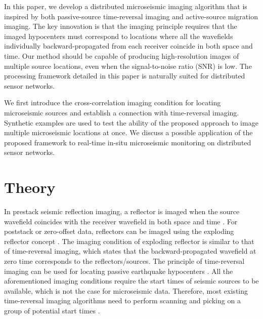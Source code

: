 In this paper, we develop a distributed microseismic imaging algorithm that is inspired by both passive-source time-reversal imaging and active-source migration imaging. The key innovation is that the imaging principle requires that the imaged hypocenters must correspond to locations where all the wavefields individually backward-propagated from each receiver coincide in both space and time. Our method should be capable of producing high-resolution images of multiple source locations, even when the signal-to-noise ratio (SNR) is low. The processing framework detailed in this paper is naturally suited for distributed sensor networks.

We first introduce the cross-correlation imaging condition for locating microseismic sources and establish a connection with time-reversal imaging. Synthetic examples are used to test the ability of the proposed approach to image multiple microseismic locations at once. We discuss a possible application of the proposed framework to real-time in-situ microseismic monitoring on distributed sensor networks.

\section{Theory}
In prestack seismic reflection imaging, a reflector is imaged when the source wavefield coincides with the receiver wavefield in both space and time \cite[]{IEI}. For poststack or zero-offset data, reflectors can be imaged using the exploding reflector concept \cite[]{loewenthal76}. The imaging condition of exploding reflector is similar to that of time-reversal imaging, which states that the backward-propagated wavefield at zero time corresponds to the reflectors/sources. The principle of time-reversal imaging can be used for locating passive earthquake hypocenters \cite[]{gajewski05}. All the aforementioned imaging conditions require the start times of seismic sources to be available, which is not the case for microseismic data. Therefore, most existing time-reversal imaging algorithms need to perform scanning and picking on a group of potential start times \cite[]{fink2006time,maxwellbook}.

